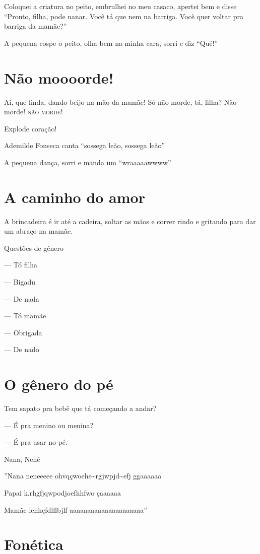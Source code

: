 Coloquei a criatura no peito, embrulhei no meu casaco, apertei bem e
disse ``Pronto, filha, pode nanar. Você tá que nem na barriga. Você quer
voltar pra barriga da mamãe?''

A pequena cospe o peito, olha bem na minha cara, sorri e diz ``Qué!''

\chapter{Não moooorde!}

Ai, que linda, dando beijo na mão da mamãe! Só não morde, tá, filha? Não
morde! \textsc{não} \textsc{morde}!

Explode coração!

Ademilde Fonseca canta ``sossega leão, sossega leão''

A pequena dança, sorri e manda um ``wraaaaawwww''

\chapter{A caminho do amor}

A brincadeira é ir até a cadeira, soltar as mãos e correr rindo e
gritando para dar um abraço na mamãe.

Questões de gênero

— Tó filha

— Bigadu

— De nada

— Tó mamãe

— Obrigada

— De nado

\chapter{O gênero do pé}

Tem sapato pra bebê que tá começando a andar?

— É pra menino ou menina?

— É pra usar no pé.

Nana, Nenê

''Nana neneeeee ohvqçwoehe\textasciitilde{}rgjwpjd\textasciitilde{}efj
ggaaaaaa

Papai k.rhgfjqwpodjoefhhfwo çaaaaaa

Mamãe lehhçfdlflbjlf aaaaaaaaaaaaaaaaaaaaa''

\chapter{Fonética}

